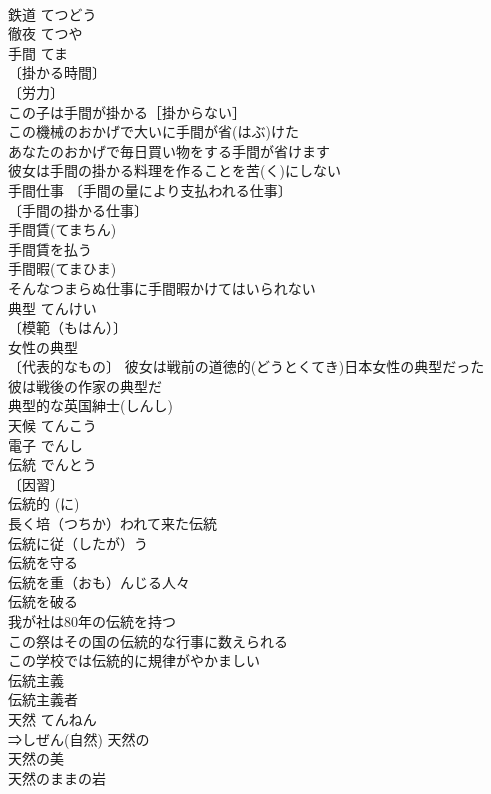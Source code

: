 \documentclass[8pt]{extreport}
\begin{document}
\begin{CJK}{UTF8}{min}
\\	鉄道	てつどう	
\\	徹夜	てつや	
\\	手間	てま	
\\	〔掛かる時間〕
\\	〔労力〕
\\	この子は手間が掛かる［掛からない］ 
\\	この機械のおかげで大いに手間が省(はぶ)けた 
\\	あなたのおかげで毎日買い物をする手間が省けます 
\\	彼女は手間の掛かる料理を作ることを苦(く)にしない 
\\	手間仕事 〔手間の量により支払われる仕事〕
\\	〔手間の掛かる仕事〕
\\	手間賃(てまちん) 
\\	手間賃を払う 
\\	手間暇(てまひま) 
\\	そんなつまらぬ仕事に手間暇かけてはいられない 
\\	典型	てんけい	
\\	〔模範（もはん）〕　
\\	女性の典型 
\\	〔代表的なもの〕 彼女は戦前の道徳的(どうとくてき)日本女性の典型だった 
\\	彼は戦後の作家の典型だ 
\\	典型的な英国紳士(しんし) 
\\	天候	てんこう	
\\	電子	でんし	
\\	伝統	でんとう	
\\	〔因習〕
\\	伝統的 (に) 
\\	長く培（つちか）われて来た伝統 
\\	伝統に従（したが）う 
\\	伝統を守る 
\\	伝統を重（おも）んじる人々 
\\	伝統を破る 
\\	我が社は80年の伝統を持つ 
\\	この祭はその国の伝統的な行事に数えられる 
\\	この学校では伝統的に規律がやかましい 
\\	伝統主義 
\\	伝統主義者 
\\	天然	てんねん	
\\	⇒しぜん(自然) 天然の 
\\	天然の美 
\\	天然のままの岩 

\end{CJK}
\end{document}
